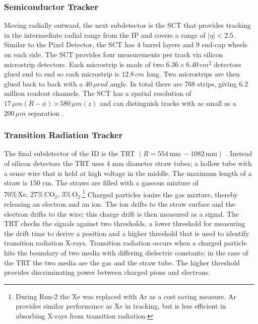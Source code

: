 		\subsubsection{Semiconductor Tracker}\label{sssec:SCT}
			Moving radially outward, the next subdetector is the \gls{SCT} that provides tracking in the intermediate radial range from the \gls{IP} and covers a range of $|\eta| < 2.5$. Similar to the Pixel Detector, the \gls{SCT} has 4 barrel layers and 9 end-cap wheels on each side. The \gls{SCT} provides four measurements per track via silicon microstrip detectors. Each microstrip is made of two $6.36 \times 6.40 \, cm^2$ detectors glued end to end so each microstrip is $12.8 \, cm$ long. Two microstrips are then glued back to back with a $40 \, \mu rad$ angle. In total there are 768 strips, giving 6.2 million readout channels. The \gls{SCT} has a spatial resolution of $17 \, \mu m (R-\phi) \times 580 \,\mu m (z)$ and can distinguish tracks with as small as a $200 \, \mu m$ separation \cite{ATLAS-ID}.

		\subsubsection{Transition Radiation Tracker}\label{sssec:TRT}
			The final subdetector of the \gls{ID} is the \gls{TRT} $(R=554 \, \mathrm{mm} \, - 1082 \, \mathrm{mm})$ . Instead of silicon detectors the \gls{TRT} uses 4 mm diameter straw tubes; a hollow tube with a sense wire that is held at high voltage in the middle. The maximum length of a straw is 150 cm. The straws are filled with a gaseous mixture of $70\% \, \mathrm{Xe,} \, 27\% \, \mathrm{CO}_2, \, 3\% \, \mathrm{O}_2$.\footnote{During Run-2 the Xe was replaced with Ar as a cost saving measure. Ar provides similar performance as Xe in tracking, but is less efficient in absorbing X-rays from transition radiation.} Charged particles ionize the gas mixture, thereby releasing an electron and an ion. The ion drifts to the straw surface and the electron drifts to the wire; this charge drift is then measured as a signal. The \gls{TRT} checks the signals against two thresholds, a lower threshold for measuring the drift time to derive a position and a higher threshold that is used to identify transition radiation X-rays. Transition radiation occurs when a charged particle hits the boundary of two media with differing dielectric constants; in the case of the \gls{TRT} the two media are the gas and the straw tube. The higher threshold provides discriminating power between charged pions and electrons.

